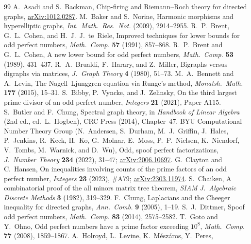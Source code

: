 \documentclass[11pt]{article}
\theoremstyle{definition}
\theoremstyle{remark}
\begin{document}
\begin{thebibliography}{99}
 A.~Asadi and S.~Backman, Chip-firing and
  Riemann--Roch theory for directed graphs,
  \href{https://arxiv.org/abs/1012.0287}{arXiv:1012.0287}.
 M.~Baker and S.~Norine, Harmonic morphisms and hyperelliptic
  graphs, \emph{Int.\ Math.\ Res.\ Not.} (2009), 2914--2955.
 R.~P.~Brent, G.~L.~Cohen, and H.~J.~J.~te~Riele, Improved
  techniques for lower bounds for odd perfect numbers, \emph{Math.\ Comp.}
  \textbf{57} (1991), 857--868.
 R.~P.~Brent and G.~L.~Cohen, A new lower bound for odd
  perfect numbers, \emph{Math.\ Comp.} \textbf{53} (1989), 431--437.
 R.~A.~Brualdi, F.~Harary, and Z.~Miller,
  Bigraphs versus digraphs via matrices, \emph{J.\ Graph Theory}
  \textbf{4} (1980), 51--73.
 M.~A.~Bennett and A.~Levin, The
  Nagell--Ljunggren equation via Runge's method, \emph{Monatsh.\ Math.}
  \textbf{177} (2015), 15--31.
 S.~Bibby, P.~Vyncke, and J.~Zelinsky,
  On the third largest prime divisor of an odd perfect number,
  \emph{Integers} \textbf{21} (2021), Paper A115.
 S.~Butler and F.~Chung, Spectral graph theory, in
  \emph{Handbook of Linear Algebra} (2nd ed., ed.\ L.~Hogben), CRC Press
  (2014), Chapter~47.
 BYU Computational Number Theory Group (N.~Andersen,
  S.~Durham, M.~J.~Griffin, J.~Hales, P.~Jenkins, R.~Keck, H.~Ko, G.~Molnar,
  E.~Moss, P.~P.~Nielsen, K.~Niendorf, V.~Tombs, M.~Warnick, and D.~Wu),
  Odd, spoof perfect factorizations, \emph{J.\ Number Theory} \textbf{234}
  (2022), 31--47; \href{https://arxiv.org/abs/2006.10697}{arXiv:2006.10697}.
 G.~Clayton and C.~Hansen, On inequalities involving
  counts of the prime factors of an odd perfect number, \emph{Integers}
  \textbf{23} (2023), \#A79;
  \href{https://arxiv.org/abs/2303.11974}{arXiv:2303.11974}.
 S.~Chaiken, A combinatorial proof of the all minors
  matrix tree theorem, \emph{SIAM J.\ Algebraic Discrete Methods}
  \textbf{3} (1982), 319--329.
 F.~Chung, Laplacians and the Cheeger inequality for
  directed graphs, \emph{Ann.\ Comb.} \textbf{9} (2005), 1--19.
 S.~J.~Dittmer, Spoof odd perfect numbers, \emph{Math.\
  Comp.} \textbf{83} (2014), 2575--2582.
 T.~Goto and Y.~Ohno, Odd perfect numbers have a prime
  factor exceeding $10^8$, \emph{Math.\ Comp.} \textbf{77} (2008),
  1859--1867.
 A.~Holroyd, L.~Levine, K.~M\'esz\'aros, Y.~Peres,

\end{thebibliography}
\end{document}
